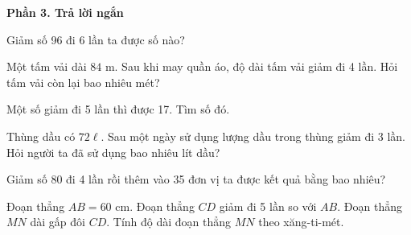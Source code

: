 \textbf{Phần 3. Trả lời ngắn}

\begin{ex} %
Giảm số 96 đi 6 lần ta được số nào?
\end{ex}

\begin{ex} %
Một tấm vải dài $84\text{ m}$. Sau khi may quần áo, độ dài tấm vải giảm đi 4 lần. Hỏi tấm vải còn lại bao nhiêu mét?
\end{ex}

\begin{ex} %
Một số giảm đi 5 lần thì được 17. Tìm số đó.
\end{ex}

\begin{ex} %
Thùng dầu có $72\ell$. Sau một ngày sử dụng lượng dầu trong thùng giảm đi 3 lần. Hỏi người ta đã sử dụng bao nhiêu lít dầu?
\end{ex}

\begin{ex} %
Giảm số 80 đi 4 lần rồi thêm vào 35 đơn vị ta được kết quả bằng bao nhiêu?
\end{ex}

\begin{ex} %
Đoạn thẳng $AB = 60\text{ cm}$. Đoạn thẳng $CD$ giảm đi 5 lần so với $AB$. Đoạn thẳng $MN$ dài gấp đôi $CD$. Tính độ dài đoạn thẳng $MN$ theo xăng-ti-mét.
\end{ex}
